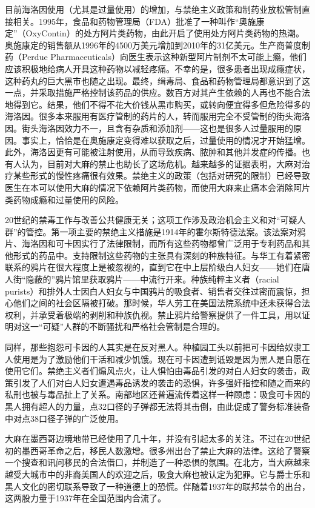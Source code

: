 \documentclass[fontset=fandol, a4paper, 12pt, openright]{ctexbook}
\begin{document}
目前海洛因使用（尤其是过量使用）的增加，与禁绝主义政策和制药业放松管制直接相关。1995年，食品和药物管理局（FDA）批准了一种叫作“奥施康定”（OxyContin）的处方阿片类药物，由此开启了使用处方阿片类药物的热潮。奥施康定的销售额从1996年的4500万美元增加到2010年的31亿美元。生产商普度制药（Perdue Pharmaceuticals）向医生表示这种新型阿片制剂不太可能上瘾，他们应该积极地给病人开具这种药物以减轻疼痛。不幸的是，很多患者出现成瘾症状，这种药丸的巨大黑市也随之出现。最终，缉毒局、食品和药物管理局都意识到了这一点，并采取措施严格控制该药品的供应。数百方对其产生依赖的人再也不能合法地得到它。结果，他们不得不花大价钱从黑市购买，或转向便宜得多但危险得多的海洛因。很多本来服用有医疗管制的药片的人，转而服用完全不受管制的街头海洛因。街头海洛因效力不一，且含有杂质和添加剂——这也是很多人过量服用的原因。事实上，恰恰是在奥施康定变得难以获取之后，过量使用的情况才开始猛增。此外，海洛因更有可能被注射使用，从而导致疾病、脓肿和其他并发症的传播。也有人认为，目前对大麻的禁止也助长了这场危机。越来越多的证据表明，大麻对治疗某些形式的慢性疼痛很有效果。禁绝主义的政策（包括对研究的限制）已经导致医生在本可以使用大麻的情况下依赖阿片类药物，而使用大麻来止痛本会消除阿片类药物成瘾和过量使用的风险。

20世纪的禁毒工作与改善公共健康无关；这项工作涉及政治机会主义和对“可疑人群”的管控。第一项主要的禁绝主义措施是1914年的霍尔斯特德法案。该法案对鸦片、海洛因和可卡因实行了法律限制，而所有这些药物都曾广泛用于专利药品和其他形式的药品中。支持限制这些药物的主张具有深刻的种族特征。与华工有着紧密联系的鸦片在很大程度上是被忽视的，直到它在中上层阶级白人妇女——她们在唐人街“隐蔽的”鸦片馆里获取鸦片——中流行开来。种族纯粹主义者（racial purists）和排外人士因白人妇女与中国鸦片的吸食者、销售者交往过密而震惊，担心他们之间的社会区隔被打破。那时候，华人劳工在美国法院系统中还未获得合法权利，并承受着极端的剥削和种族仇视。禁止鸦片给警察提供了一件工具，用以证明对这一“可疑”人群的不断骚扰和严格社会管制是合理的。

同样，那些抱怨可卡因的人其实是在反对黑人。种植园工头以前把可卡因给奴隶工人使用是为了激励他们干活和减少饥饿。现在可卡因遭到诋毁是因为黑人是自愿在使用它们。禁绝主义者们煽风点火，让人惧怕由毒品引发的对白人妇女的袭击，政策引发了人们对白人妇女遭遇毒品诱发的袭击的恐惧，许多强奸指控和随之而来的私刑也被与毒品扯上了关系。南部地区还普遍流传着这样一种顾虑：吸食可卡因的黑人拥有超人的力量，点32口径的子弹都无法将其击倒，由此促成了警务标准装备中对点38口径子弹的广泛使用。

大麻在墨西哥边境地带已经使用了几十年，并没有引起太多的关注。不过在20世纪初的墨西哥革命之后，移民人数激增。很多州出台了禁止大麻的法律。这给了警察一个搜查和讯问移民的合法借口，并制造了一种恐惧的氛围。在北方，当大麻越来越受大城市中的非裔美国人的欢迎之后，吸食大麻也被认定为犯罪。它与爵士乐和黑人文化的密切联系导致了一种道德上的恐慌。伴随着1937年的联邦禁令的出台，这两股力量于1937年在全国范围内合流了。
\end{document}
